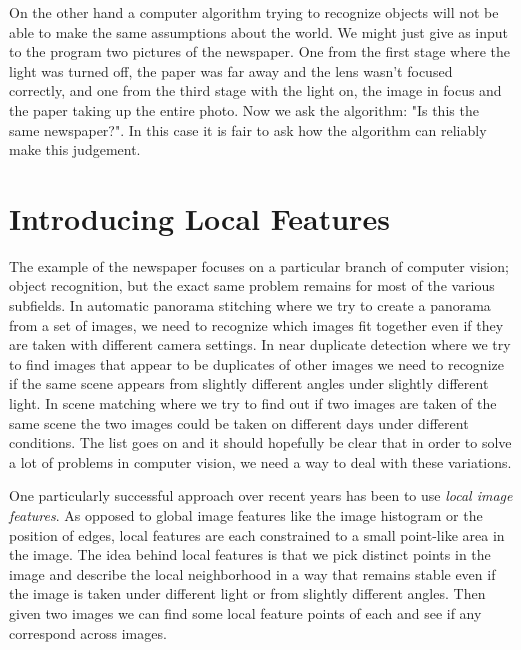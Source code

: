On the other hand a computer algorithm trying to recognize objects will 
not be able to make the same assumptions about the world. We might just 
give as input to the program two pictures of the newspaper. One from the 
first stage where the light was turned off, the paper was far away and 
the lens wasn't focused correctly, and one from the third stage with the 
light on, the image in focus and the paper taking up the entire photo.  
Now we ask the algorithm: "Is this the same newspaper?". In this case it 
is fair to ask how the algorithm can reliably make this judgement.

\section{Introducing Local Features}

The example of the newspaper focuses on a particular branch of computer 
vision; object recognition, but the exact same problem remains for most 
of the various subfields. In automatic panorama stitching where we try 
to create a panorama from a set of images, we need to recognize which 
images fit together even if they are taken with different camera 
settings. In near duplicate detection where we try to find images that 
appear to be duplicates of other images we need to recognize if the same 
scene appears from slightly different angles under slightly different 
light. In scene matching where we try to find out if two images are 
taken of the same scene the two images could be taken on different days 
under different conditions. The list goes on and it should hopefully be 
clear that in order to solve a lot of problems in computer vision, we 
need a way to deal with these variations.

One particularly successful approach over recent years has been to use 
\emph{local image features}. As opposed to global image features like 
the image histogram or the position of edges, local features are each 
constrained to a small point-like area in the image. The idea behind 
local features is that we pick distinct points in the image and describe 
the local neighborhood in a way that remains stable even if the image is 
taken under different light or from slightly different angles. Then 
given two images we can find some local feature points of each and see 
if any correspond across images.

